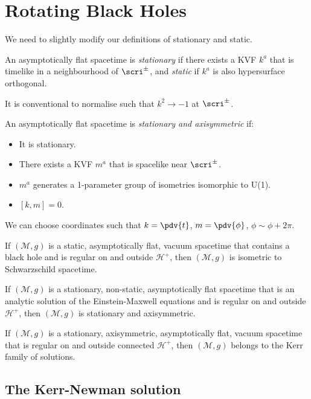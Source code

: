 \documentclass{jknotes}
\begin{document}
\section{Rotating Black Holes}
We need to slightly modify our definitions of stationary and static.
\begin{defn}
    An asymptotically flat spacetime is \emph{stationary} if there exists a KVF \(k^a\) that is timelike in a neighbourhood of \(\scri^\pm\), and \emph{static} if \(k^a\) is also hypersurface orthogonal.
\end{defn}
It is conventional to normalise such that \(k^2\to-1\) at \(\scri^\pm\).
\begin{defn}
    An asymptotically flat spacetime is \emph{stationary and axisymmetric} if:
    \begin{itemize}
        \item It is stationary.
        \item There exists a KVF \(m^a\) that is spacelike near \(\scri^\pm\).
        \item \(m^a\) generates a 1-parameter group of isometries isomorphic to U(1).
        \item \([k,m]=0\).
    \end{itemize}
\end{defn}
We can choose coordinates such that \(k=\pdv{t}\), \(m=\pdv{\phi}\), \(\phi \sim \phi+2\pi\).
\begin{theorem}
    If \((\mathcal{M},g)\) is a static, asymptotically flat, vacuum spacetime that contains a black hole and is regular on and outside \(\mathcal{H}^+\), then \((\mathcal{M},g)\) is isometric to Schwarzschild spacetime.
\end{theorem}
\begin{theorem}
    If \((\mathcal{M},g)\) is a stationary, non-static, asymptotically flat spacetime that is an analytic solution of the Einstein-Maxwell equations and is regular on and outside \(\mathcal{H}^+\), then \((\mathcal{M},g)\) is stationary and axisymmetric.
\end{theorem}
\begin{theorem}
    If \((\mathcal{M},g)\) is a stationary, axisymmetric, asymptotically flat, vacuum spacetime that is regular on and outside connected \(\mathcal{H}^+\), then \((\mathcal{M},g)\) belongs to the Kerr family of solutions.
\end{theorem}

\subsection{The Kerr-Newman solution}
\end{document}
